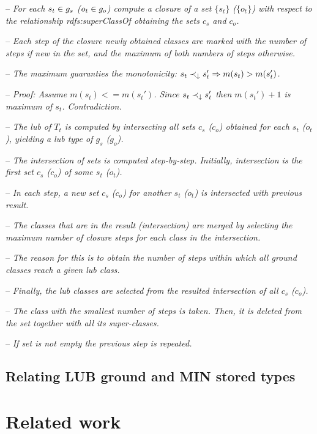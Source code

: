 \documentclass[runningheads]{llncs}
\newcommand{\darr}{\downarrow}
\newcommand{\notes}[1]{\noindent\begin{small}-- \emph{#1}\hfill\break\end{small}}
\begin{document}
{\notes{For each $s_t\in\/g_s$ ($o_t\in\/g_o$) compute a closure of a set $\{s_t\}$ ($\{o_t\}$) with respect to the relationship rdfs:superClassOf obtaining the sets $c_s$ and $c_o$.}
\notes{Each step of the closure newly obtained classes are marked with the number of steps if new in the set, and the maximum of both numbers of steps otherwise.}
\notes{The maximum guaranties the monotonicity: $s_t\prec_\darr\/s_t'\Rightarrow\/m(s_t)>m(s_t')$.}
\notes{Proof: Assume $m(s_t)<=m(s_t')$. Since $s_t\prec_\darr\/s_t'$ then $m(s_t')+1$ is maximum of $s_t$. Contradiction.}

\notes{The lub of $T_t$ is computed by intersecting all sets $c_s$ ($c_o$) obtained for each $s_t$ ($o_t$), yielding a lub type of $g_s$ ($g_o$).}
\notes{The intersection of sets is computed step-by-step. Initially, intersection is the first set $c_s$ ($c_o$) of some $s_t$ ($o_t$).}
\notes{In each step, a new set $c_s$ ($c_o$) for another $s_t$ ($o_t$) is intersected with previous result.}
\notes{The classes that are in the result (intersection) are merged by selecting the maximum number of closure steps for each class in the intersection.}
\notes{The reason for this is to obtain the number of steps within which all ground classes reach a given lub class.}

\notes{Finally, the lub classes are selected from the resulted intersection of all $c_s$ ($c_o$).}
\notes{The class with the smallest number of steps is taken. Then, it is deleted from the set together with all its super-classes.}
\notes{If set is not empty the previous step is repeated.}



\subsection{Relating LUB ground and MIN stored types}}









\section{Related work}
\end{document}
